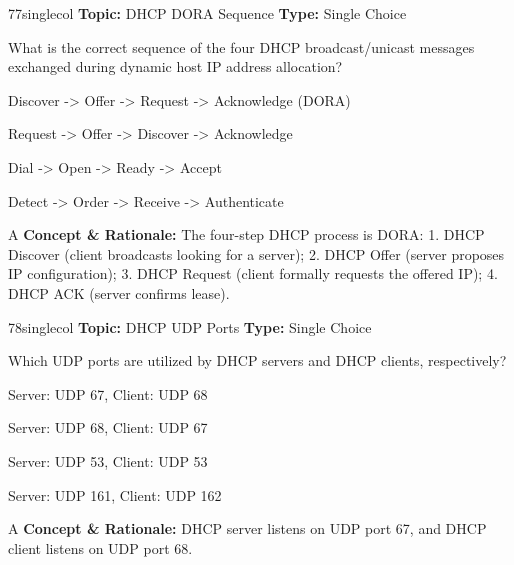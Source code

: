 \begin{qcard}{77}{singlecol}
\textcolor{darkslate!75}{\small\textbf{Topic:} DHCP DORA Sequence \hfill \textbf{Type:} Single Choice}\vspace{0.4em}\par
What is the correct sequence of the four DHCP broadcast/unicast messages exchanged during dynamic host IP address allocation?
\begin{qoptions}
\item Discover -\textgreater{} Offer -\textgreater{} Request -\textgreater{} Acknowledge (DORA)
\item Request -\textgreater{} Offer -\textgreater{} Discover -\textgreater{} Acknowledge
\item Dial -\textgreater{} Open -\textgreater{} Ready -\textgreater{} Accept
\item Detect -\textgreater{} Order -\textgreater{} Receive -\textgreater{} Authenticate
\end{qoptions}
\end{qcard}
\nopagebreak
\begin{explainbox}{A}
\textbf{Concept \& Rationale:} The four-step DHCP process is DORA: 1. DHCP Discover (client broadcasts looking for a server); 2. DHCP Offer (server proposes IP configuration); 3. DHCP Request (client formally requests the offered IP); 4. DHCP ACK (server confirms lease).
\end{explainbox}

\begin{qcard}{78}{singlecol}
\textcolor{darkslate!75}{\small\textbf{Topic:} DHCP UDP Ports \hfill \textbf{Type:} Single Choice}\vspace{0.4em}\par
Which UDP ports are utilized by DHCP servers and DHCP clients, respectively?
\begin{qoptions}
\item Server: UDP 67, Client: UDP 68
\item Server: UDP 68, Client: UDP 67
\item Server: UDP 53, Client: UDP 53
\item Server: UDP 161, Client: UDP 162
\end{qoptions}
\end{qcard}
\nopagebreak
\begin{explainbox}{A}
\textbf{Concept \& Rationale:} DHCP server listens on UDP port 67, and DHCP client listens on UDP port 68.
\end{explainbox}

